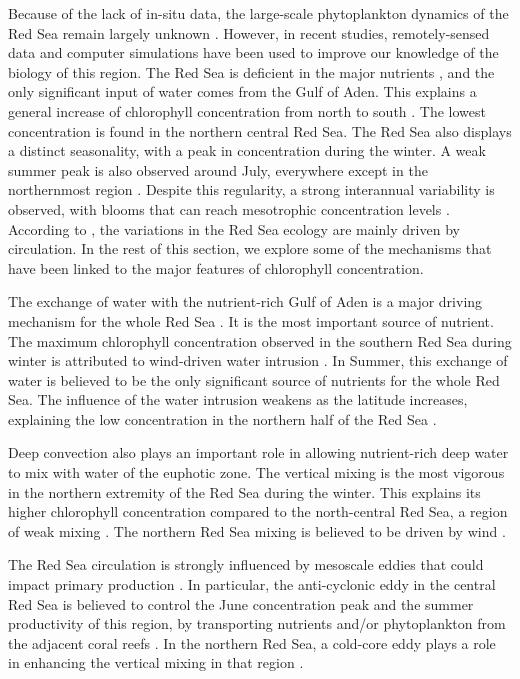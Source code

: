 Because of the lack of in-situ data, the large-scale phytoplankton dynamics of the Red Sea remain largely unknown \cite{Raitsos2013, Triantafyllou2014}. However, in recent studies, remotely-sensed data and computer simulations have been used to improve our knowledge of the biology of this region. The Red Sea is deficient in the major nutrients \cite{Weikert1987}, and the only significant input of water comes from the Gulf of Aden. This explains a general increase of chlorophyll concentration from north to south \cite{Raitsos2013}. The lowest concentration is found in the northern central Red Sea. The Red Sea also displays a distinct seasonality, with a peak in concentration during the winter. A weak summer peak is also observed around July, everywhere except in the northernmost region \cite{Raitsos2013}. Despite this regularity, a strong interannual variability is observed, with blooms that can reach mesotrophic concentration levels \cite{Raitsos2013}. According to \cite{Triantafyllou2014}, the variations in the Red Sea ecology are mainly driven by circulation. In the rest of this section, we explore some of the mechanisms that have been linked to the major features of chlorophyll concentration.

The exchange of water with the nutrient-rich Gulf of Aden is a major driving mechanism for the whole Red Sea \cite{Triantafyllou2014}. It is the most important source of nutrient. The maximum chlorophyll concentration observed in the southern Red Sea during winter is attributed to wind-driven water intrusion \cite{Raitsos2013}. In Summer, this exchange of water is believed to be the only significant source of nutrients for the whole Red Sea. The influence of the water intrusion weakens as the latitude increases, explaining the low concentration in the northern half of the Red Sea \cite{Raitsos2013}.

Deep convection also plays an important role in allowing nutrient-rich deep water to mix with water of the euphotic zone. The vertical mixing is the most vigorous in the northern extremity of the Red Sea during the winter. This explains its higher chlorophyll concentration compared to the north-central Red Sea, a region of weak mixing \cite{Raitsos2013}. The northern Red Sea mixing is believed to be driven by wind \cite{Raitsos2013}.

The Red Sea circulation is strongly influenced by mesoscale eddies \cite{Yao2014, Zhan2014} that could impact primary production \cite{Zhai2013}. In particular, the anti-cyclonic eddy in the central Red Sea is believed to control the June concentration peak and the summer productivity of this region, by transporting nutrients and/or phytoplankton from the adjacent coral reefs \cite{Raitsos2013}. In the northern Red Sea, a cold-core eddy plays a role in enhancing the vertical mixing in that region \cite{Raitsos2013}.

